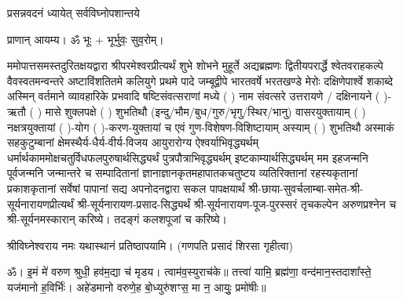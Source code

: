 
\setlength{\parindent}{0pt}





{प्रसन्नवदनं ध्यायेत् सर्वविघ्नोपशान्तये}
 
प्राणान्  आयम्य।  ॐ भूः + भूर्भुवः॒ सुव॒रोम्।


ममोपात्तसमस्तदुरितक्षयद्वारा श्रीपरमेश्वरप्रीत्यर्थं शुभे शोभने मुहूर्ते अद्यब्रह्मणः
द्वितीयपरार्द्धे श्वेतवराहकल्पे वैवस्वतमन्वन्तरे अष्टाविंशतितमे कलियुगे प्रथमे पादे
जम्बूद्वीपे भारतवर्षे भरतखण्डे मेरोः दक्षिणेपार्श्वे शकाब्दे अस्मिन् वर्तमाने व्यावहारिके
प्रभवादि षष्टिसंवत्सराणां मध्ये (	) नाम संवत्सरे उत्तरायणे / दक्षिनायने  (  )-ऋतौ  (  ) मासे 
शुक्लपक्षे (  ) शुभतिथौ (इन्दु/भौम/बुध/गुरु/भृगु/स्थिर/भानु) वासरयुक्तायाम्
(  ) नक्षत्रयुक्तायां (  )-योग (  )-करण-युक्तायां च एवं गुण-विशेषण-विशिष्टायाम्
अस्याम् (  ) शुभतिथौ अस्माकं सहकुटुम्बानां क्षेमस्थैर्य-धैर्य-वीर्य-विजय आयुरारोग्य ऐश्वर्याभिवृद्ध्यर्थम्
 धर्मार्थकाममोक्ष\-चतुर्विधफलपुरुषार्थसिद्ध्यर्थं पुत्रपौत्राभिवृद्ध्यर्थम् इष्टकाम्यार्थसिद्ध्यर्थम्
मम इहजन्मनि पूर्वजन्मनि जन्मान्तरे च सम्पादितानां ज्ञानाज्ञानकृतमहा\-पातकचतुष्टय
व्यतिरिक्तानां रहस्यकृतानां प्रकाशकृतानां सर्वेषां पापानां सद्य अपनोदनद्वारा सकल 
पापक्षयार्थं 
श्री-छाया-सुवर्चलाम्बा-समेत-श्री-सूर्यनारायणप्रीत्यर्थं
श्री-सूर्यनारायण-प्रसाद-सिद्ध्यर्थं श्री-सूर्यनारायण-पूज-पुरस्सरं तृचकल्पेन अरुणप्रश्नेन च श्री-सूर्यनमस्कारान् 
करिष्ये। तदङ्गं कलशपूजां च करिष्ये।


श्रीविघ्नेश्वराय नमः यथास्थानं प्रतिष्ठापयामि।
(गणपति प्रसादं शिरसा गृहीत्वा)












 

ॐ। इ॒मं मे॑ वरुण श्रुधी॒ हव॑म॒द्या च॑ मृडय। त्वाम॑व॒स्युराच॑के॥ तत्त्वा॑ यामि॒ ब्रह्म॑णा॒ वन्द॑मान॒स्तदाशा᳚स्ते॒ यज॑मानो ह॒विर्भिः॑। अहे॑डमानो वरुणे॒ह बो॒ध्युरु॑शꣳस॒ मा न॒ आयुः॒ प्रमो॑षीः॥

